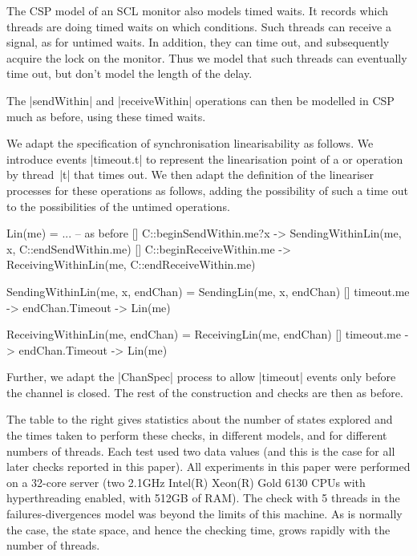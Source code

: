 The CSP model of an SCL monitor also models timed waits.  It records which
threads are doing timed waits on which conditions.  Such threads can receive a
signal, as for untimed waits.  In addition, they can time out, and
subsequently acquire the lock on the monitor.  Thus we model that such threads
can eventually time out, but don't model the length of the delay.

The |sendWithin| and |receiveWithin| operations can then be modelled in CSP
much as before, using these timed waits.



\inlineCSP

We adapt the specification of synchronisation linearisability as follows.  We
introduce events |timeout.t| to represent the linearisation point of a
 or  operation by thread~|t| that times
out.  We then adapt the definition of the lineariser processes for these
operations as follows, adding the possibility of such a time out to the
possibilities of the untimed operations.
%
\begin{cspm}
Lin(me) = 
  ... -- as before
  [] C::beginSendWithin.me?x -> SendingWithinLin(me, x, C::endSendWithin.me)
  [] C::beginReceiveWithin.me -> ReceivingWithinLin(me, C::endReceiveWithin.me)

SendingWithinLin(me, x, endChan) = 
  SendingLin(me, x, endChan)
  [] timeout.me -> endChan.Timeout -> Lin(me)

ReceivingWithinLin(me, endChan) = 
  ReceivingLin(me, endChan) 
  [] timeout.me -> endChan.Timeout -> Lin(me)
\end{cspm}
%
Further, we adapt the |ChanSpec| process to allow |timeout| events only before
the channel is closed.  The rest of the construction and checks are then as
before. 

%
The table to the right gives statistics about the number of states explored
and the times taken to perform these checks, in different models, and for
different numbers of threads.  Each test used two data values (and this is the
case for all later checks reported in this paper).  All
experiments in this paper were performed on a 32-core server (two 2.1GHz
Intel(R) Xeon(R) Gold 6130 CPUs with hyperthreading enabled, with 512GB of
RAM).  The check with 5 threads in the failures-divergences model was beyond
the limits of this machine.  As is normally the case, the state space, and
hence the checking time, grows rapidly with the number of threads.   
\end{window}

